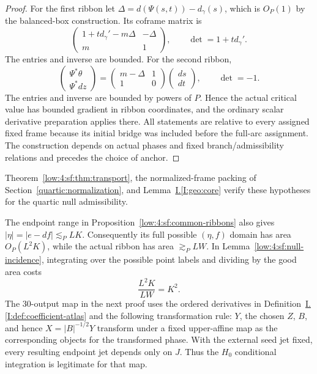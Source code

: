\documentclass[11pt]{amsart}
\theoremstyle{definition}
\theoremstyle{remark}
\numberwithin{equation}{section}
\newcommand{\partIref}[1]{\hyperref[I:#1]{I.\ref*{I:#1}}}
\begin{document}
\begin{proof}
For the first ribbon let $\Delta=d(\Psi(s,t))-d_\gamma(s)$, which is $O_P(1)$ by the balanced-box construction. Its coframe matrix is
\[
\begin{pmatrix}1+t d_\gamma'-m\Delta&-\Delta\\m&1\end{pmatrix},\qquad \det=1+t d_\gamma'.
\]
The entries and inverse are bounded. For the second ribbon,
\[
\begin{pmatrix}\Psi^*\theta\\\Psi^*dz\end{pmatrix}
=\begin{pmatrix}m-\Delta&1\\1&0\end{pmatrix}\begin{pmatrix}ds\\dt\end{pmatrix},
\qquad \det=-1.
\]
The entries and inverse are bounded by powers of $P$. Hence the actual critical value has bounded gradient in ribbon coordinates, and the ordinary scalar derivative preparation applies there. All statements are relative to every assigned fixed frame because its initial bridge was included before the full-arc assignment. The construction depends on actual phases and fixed branch/admissibility relations and precedes the choice of anchor.
\end{proof}

Theorem~\ref{low:4:sf:thm:transport}, the normalized-frame packing of Section~\ref{quartic:normalization}, and Lemma~\partIref{geo:core} verify these hypotheses for the quartic null admissibility.

The endpoint range in Proposition~\ref{low:4:sf:common-ribbons} also gives $|\eta|=|e-df|\lesssim_PLK$. Consequently its full possible $(\eta,f)$ domain has area $O_P(L^2K)$, while the actual ribbon has area $\gtrsim_PLW$. In Lemma~\ref{low:4:sf:null-incidence}, integrating over the possible point labels and dividing by the good area costs
\begin{equation}\label{low:4:sf:null-tonelli}
 \frac{L^2K}{LW}=K^2.
\end{equation}
The $30$-output map in the next proof uses the ordered derivatives in Definition~\partIref{def:coefficient-atlas} and the following transformation rule: $Y$, the chosen $Z$, $B$, and hence $X=|B|^{-1/2}Y$ transform under a fixed upper-affine map as the corresponding objects for the transformed phase. With the external seed jet fixed, every resulting endpoint jet depends only on $J$. Thus the $H_0$ conditional integration is legitimate for that map.
\end{document}
